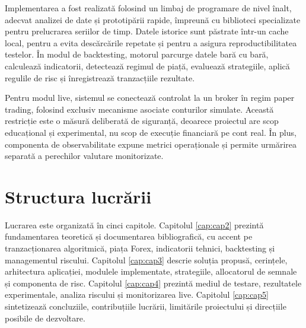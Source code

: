 Implementarea a fost realizată folosind un limbaj de programare de nivel înalt, adecvat analizei de date și prototipării rapide, împreună cu biblioteci specializate pentru prelucrarea seriilor de timp. Datele istorice sunt păstrate într-un cache local, pentru a evita descărcările repetate și pentru a asigura reproductibilitatea testelor. În modul de backtesting, motorul parcurge datele bară cu bară, calculează indicatorii, detectează regimul de piață, evaluează strategiile, aplică regulile de risc și înregistrează tranzacțiile rezultate.

Pentru modul live, sistemul se conectează controlat la un broker în regim paper trading, folosind exclusiv mecanisme asociate conturilor simulate. Această restricție este o măsură deliberată de siguranță, deoarece proiectul are scop educațional și experimental, nu scop de execuție financiară pe cont real. În plus, componenta de observabilitate expune metrici operaționale și permite urmărirea separată a perechilor valutare monitorizate.

\section{Structura lucrării}
\label{cap:cap1:structura}

Lucrarea este organizată în cinci capitole. Capitolul \ref{cap:cap2} prezintă fundamentarea teoretică și documentarea bibliografică, cu accent pe tranzacționarea algoritmică, piața Forex, indicatorii tehnici, backtesting și managementul riscului. Capitolul \ref{cap:cap3} descrie soluția propusă, cerințele, arhitectura aplicației, modulele implementate, strategiile, allocatorul de semnale și componenta de risc. Capitolul \ref{cap:cap4} prezintă mediul de testare, rezultatele experimentale, analiza riscului și monitorizarea live. Capitolul \ref{cap:cap5} sintetizează concluziile, contribuțiile lucrării, limitările proiectului și direcțiile posibile de dezvoltare.
